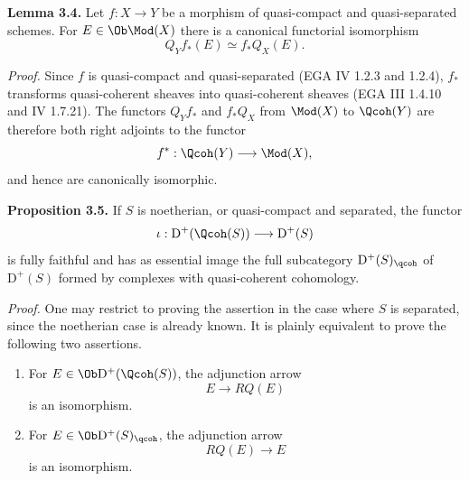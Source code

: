 \documentclass[11pt]{article}
\begin{document}
\textbf{Lemma 3.4.} Let $f:X\to Y$ be a morphism of quasi-compact and quasi-separated schemes. For $E\in\Ob\Mod(X)$ there is a canonical functorial isomorphism
\[
 Q_Y f_*(E)\simeq f_*Q_X(E).
\]

\emph{Proof.} Since $f$ is quasi-compact and quasi-separated (EGA IV 1.2.3 and 1.2.4), $f_*$ transforms quasi-coherent sheaves into quasi-coherent sheaves (EGA III 1.4.10 and IV 1.7.21). The functors $Q_Yf_*$ and $f_*Q_X$ from $\Mod(X)$ to $\Qcoh(Y)$ are therefore both right adjoints to the functor
\[
 f^*: \Qcoh(Y)\longrightarrow \Mod(X),
\]
and hence are canonically isomorphic.

\textbf{Proposition 3.5.} If $S$ is noetherian, or quasi-compact and separated, the functor
\[
 \iota:\mathrm D^+(\Qcoh(S))\longrightarrow \mathrm D^+(S)
\]
is fully faithful and has as essential image the full subcategory $\mathrm D^+(S)_{\qcoh}$ of $\mathrm D^+(S)$ formed by complexes with quasi-coherent cohomology.

\emph{Proof.} One may restrict to proving the assertion in the case where $S$ is separated, since the noetherian case is already known. It is plainly equivalent to prove the following two assertions.

\begin{enumerate}[label=(3.5.\arabic*)]
\item For $E\in\Ob\mathrm D^+(\Qcoh(S))$, the adjunction arrow
\[
 E\longrightarrow RQ(E)
\]
is an isomorphism.
\item For $E\in\Ob\mathrm D^+(S)_{\qcoh}$, the adjunction arrow
\[
 RQ(E)\longrightarrow E
\]
is an isomorphism.
\end{enumerate}
\end{document}
